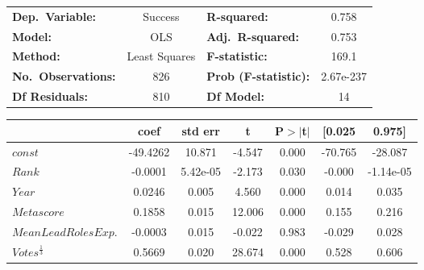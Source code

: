         \begin{table}[H]
            \begin{center}
                \begin{tabular}{lclc}
                    \toprule
                    \textbf{Dep.~Variable:}    & Success       & \textbf{  R-squared:         } & 0.758     \\
                    \textbf{Model:}            & OLS           & \textbf{  Adj.~R-squared:    } & 0.753     \\
                    \textbf{Method:}           & Least Squares & \textbf{  F-statistic:       } & 169.1     \\
                    \textbf{No.~Observations:} & 826           & \textbf{  Prob (F-statistic):} & 2.67e-237 \\
                    \textbf{Df Residuals:}     & 810           & \textbf{Df Model:}             & 14        \\
                    \bottomrule
                \end{tabular}
                \begin{tabular}{lcccccc}
                                                    & \textbf{coef} & \textbf{std err} & \textbf{t} & \textbf{P$> |$t$|$} & \textbf{[0.025} & \textbf{0.975]} \\
                    \midrule
                    \textbf{$const$}                & -49.4262      & 10.871           & -4.547     & 0.000               & -70.765         & -28.087         \\
                    \textbf{$Rank$}                 & -0.0001       & 5.42e-05         & -2.173     & 0.030               & -0.000          & -1.14e-05       \\
                    \textbf{$Year$}                 & 0.0246        & 0.005            & 4.560      & 0.000               & 0.014           & 0.035           \\
                    \textbf{$Metascore$}            & 0.1858        & 0.015            & 12.006     & 0.000               & 0.155           & 0.216           \\
                    \textbf{$Mean Lead Roles Exp.$} & -0.0003       & 0.015            & -0.022     & 0.983               & -0.029          & 0.028           \\
                    \textbf{$Votes^{\frac{1}{3}}$}  & 0.5669        & 0.020            & 28.674     & 0.000               & 0.528           & 0.606           \\

\end{tabular}
\end{center}
\end{table}
